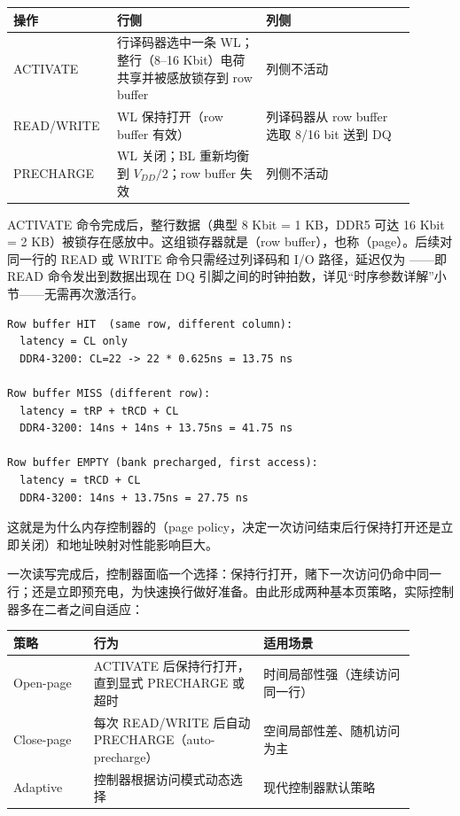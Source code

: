 \begin{longtable}{L{0.2\linewidth}L{0.35\linewidth}L{0.35\linewidth}}
\toprule
操作 & 行侧 & 列侧 \\
\midrule
ACTIVATE & 行译码器选中一条 WL；整行（8--16 Kbit）电荷共享并被感放锁存到 row buffer & 列侧不活动 \\
READ/WRITE & WL 保持打开（row buffer 有效） & 列译码器从 row buffer 选取 8/16 bit 送到 DQ \\
PRECHARGE & WL 关闭；BL 重新均衡到 $V_{DD}/2$；row buffer 失效 & 列侧不活动 \\
\bottomrule
\end{longtable}


ACTIVATE 命令完成后，整行数据（典型 8 Kbit = 1 KB，DDR5 可达 16 Kbit = 2 KB）被锁存在感放中。这组锁存器就是（row buffer），也称（page）。后续对同一行的 READ 或 WRITE 命令只需经过列译码和 I/O 路径，延迟仅为 ——即 READ 命令发出到数据出现在 DQ 引脚之间的时钟拍数，详见“时序参数详解”小节——无需再次激活行。

\begin{lstlisting}[numbers=none,caption={行缓冲命中与未命中的延迟对比}]
Row buffer HIT  (same row, different column):
  latency = CL only
  DDR4-3200: CL=22 -> 22 * 0.625ns = 13.75 ns

Row buffer MISS (different row):
  latency = tRP + tRCD + CL
  DDR4-3200: 14ns + 14ns + 13.75ns = 41.75 ns

Row buffer EMPTY (bank precharged, first access):
  latency = tRCD + CL
  DDR4-3200: 14ns + 13.75ns = 27.75 ns
\end{lstlisting}

这就是为什么内存控制器的（page policy，决定一次访问结束后行保持打开还是立即关闭）和地址映射对性能影响巨大。


一次读写完成后，控制器面临一个选择：保持行打开，赌下一次访问仍命中同一行；还是立即预充电，为快速换行做好准备。由此形成两种基本页策略，实际控制器多在二者之间自适应：

\begin{longtable}{L{0.18\linewidth}L{0.38\linewidth}L{0.34\linewidth}}
\toprule
策略 & 行为 & 适用场景 \\
\midrule
Open-page & ACTIVATE 后保持行打开，直到显式 PRECHARGE 或超时 & 时间局部性强（连续访问同一行） \\
Close-page & 每次 READ/WRITE 后自动 PRECHARGE（auto-precharge） & 空间局部性差、随机访问为主 \\
Adaptive & 控制器根据访问模式动态选择 & 现代控制器默认策略 \\
\bottomrule
\end{longtable}

